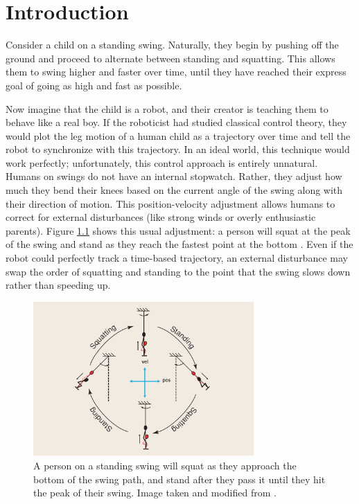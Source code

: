 

\chapter{Introduction}

Consider a child on a standing swing.
Naturally, they begin by pushing off the ground and proceed to alternate between
standing and squatting. 
This allows them to swing higher and faster over time, until they have reached
their express goal of going as high and fast as possible.

Now imagine that the child is a robot, and their creator is teaching them to
behave like a real boy.
If the roboticist had studied classical control theory, they would plot the leg
motion of a human child as a trajectory over time and tell the robot to
synchronize with this trajectory.
In an ideal world, this technique would work perfectly; unfortunately, this
control approach is entirely unnatural. 
Humans on swings do not have an internal stopwatch.
Rather, they adjust how much they bend their knees based on the current angle of
the swing along with their direction of motion.
This position-velocity adjustment allows humans to correct for external
disturbances (like strong winds or overly enthusiastic parents).
Figure \ref{fig:swing-pos-vel} shows this usual adjustment:
a person will squat at the peak of the swing and stand as they reach the fastest
point at the bottom \cite{pumping_swing_standing_squatting}.
Even if the robot could perfectly track a time-based trajectory, an external
disturbance may swap the order of squatting and standing to the point that
the swing slows down rather than speeding up.

\begin{figure}
    \centering
    \includegraphics[width=0.75\textwidth]{images/swing_pos_vel.png}
    \caption{A person on a standing swing will squat as they approach the
        bottom of the swing path, and stand after they pass it until they hit
        the peak of their swing. Image taken and modified from
    \cite{pumping_swing_standing_squatting}.}
    \label{fig:swing-pos-vel}
\end{figure}

